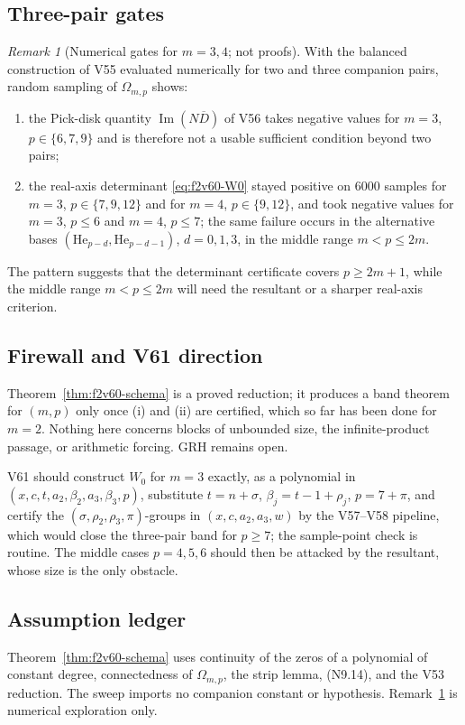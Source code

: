 \documentclass[11pt]{article}
\theoremstyle{definition}
\theoremstyle{remark}
\newtheorem{remark}[theorem]{Remark}
\begin{document}
\subsection{Three-pair gates}

\begin{remark}[Numerical gates for \(m=3,4\); not proofs]
\label{rem:f2v60-gates}
With the balanced construction of V55 evaluated numerically for two and
three companion pairs, random sampling of \(\Omega_{m,p}\) shows:
\begin{enumerate}[label=\textup{(\alph*)}]
\item the Pick-disk quantity \(\operatorname{Im}(N\overline D)\) of
V56 takes negative values for \(m=3\), \(p\in\{6,7,9\}\) and is
therefore not a usable sufficient condition beyond two pairs;
\item the real-axis determinant \eqref{eq:f2v60-W0} stayed positive on
\(6000\) samples for \(m=3\), \(p\in\{7,9,12\}\) and for \(m=4\),
\(p\in\{9,12\}\), and took negative values for \(m=3\), \(p\le6\) and
\(m=4\), \(p\le7\); the same failure occurs in the alternative bases
\((\mathrm{He}_{p-d},\mathrm{He}_{p-d-1})\), \(d=0,1,3\), in the
middle range \(m<p\le2m\).
\end{enumerate}
The pattern suggests that the determinant certificate covers
\(p\ge2m+1\), while the middle range \(m<p\le2m\) will need the
resultant or a sharper real-axis criterion.
\end{remark}

\subsection*{Firewall and V61 direction}
\label{fire:f2v60}
Theorem~\ref{thm:f2v60-schema} is a proved reduction; it produces a
band theorem for \((m,p)\) only once (i) and (ii) are certified, which
so far has been done for \(m=2\).  Nothing here concerns blocks of
unbounded size, the infinite-product passage, or arithmetic forcing.
GRH remains open.

V61 should construct \(W_0\) for \(m=3\) exactly, as a polynomial in
\((x,c,t,a_2,\beta_2,a_3,\beta_3,p)\), substitute
\(t=n+\sigma\), \(\beta_j=t-1+\rho_j\), \(p=7+\pi\), and certify the
\((\sigma,\rho_2,\rho_3,\pi)\)-groups in \((x,c,a_2,a_3,w)\) by the
V57--V58 pipeline, which would close the three-pair band for
\(p\ge7\); the sample-point check is routine.  The middle cases
\(p=4,5,6\) should then be attacked by the resultant, whose size is the
only obstacle.

\subsection*{Assumption ledger}
\label{ass:f2v60}
Theorem~\ref{thm:f2v60-schema} uses continuity of the zeros of a
polynomial of constant degree, connectedness of \(\Omega_{m,p}\), the
strip lemma, \textup{(N9.14)}, and the V53 reduction.  The sweep imports
no companion constant or hypothesis.  Remark~\ref{rem:f2v60-gates} is
numerical exploration only.
\endgroup
\end{document}
